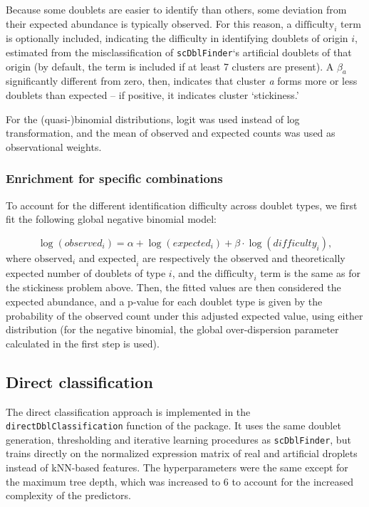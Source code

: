 \documentclass[10pt,a4paper,twocolumn]{article}
\begin{document}
Because some doublets are easier to identify than others, some deviation from their expected abundance is typically observed.
For this reason, a \(\text{difficulty}_i\) term is optionally included, indicating the difficulty in identifying doublets of origin \(i\), estimated from the misclassification of \texttt{scDblFinder}`s artificial doublets of that origin (by default, the term is included if at least 7 clusters are present).
A \(\beta_a\) significantly different from zero, then, indicates that cluster \emph{a} forms more or less doublets than expected -- if positive, it indicates cluster `stickiness.'

For the (quasi-)binomial distributions, logit was used instead of log transformation, and the mean of observed and expected counts was used as observational weights.

\subsubsection{Enrichment for specific combinations}

To account for the different identification difficulty across doublet types, we first fit the following global negative binomial model:

\[
\log(observed_i) = \alpha + \log(expected_i) + \beta \cdot \log(difficulty_i),
\]
where \(\text{observed}_i\) and \(\text{expected}_i\) are respectively the observed and theoretically expected number of doublets of type \(i\), and the \(\text{difficulty}_i\) term is the same as for the stickiness problem above.
Then, the fitted values are then considered the expected abundance, and a p-value for each doublet type is given by the probability of the observed count under this adjusted expected value, using either distribution (for the negative binomial, the global over-dispersion parameter calculated in the first step is used).

\subsection{Direct classification}

The direct classification approach is implemented in the \texttt{directDblClassification} function of the package. It uses the same doublet generation, thresholding and iterative learning procedures as \texttt{scDblFinder}, but trains directly on the normalized expression matrix of real and artificial droplets instead of kNN-based features. The hyperparameters were the same except for the maximum tree depth, which was increased to 6 to account for the increased complexity of the predictors.
\end{document}
